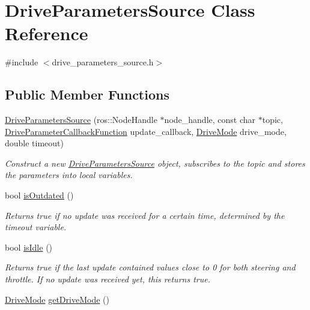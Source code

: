 \hypertarget{class_drive_parameters_source}{}\section{Drive\+Parameters\+Source Class Reference}
\label{class_drive_parameters_source}


{\ttfamily \#include $<$drive\+\_\+parameters\+\_\+source.\+h$>$}

\subsection*{Public Member Functions}
\begin{DoxyCompactItemize}
\item 
\hyperlink{class_drive_parameters_source_ab14e32856e8a672539b1b3ea9e511d0a}{Drive\+Parameters\+Source} (ros\+::\+Node\+Handle $\ast$node\+\_\+handle, const char $\ast$topic, \hyperlink{drive__parameters__source_8h_a87328cd02ddd6c83ff6d4943cf8a93c2}{Drive\+Parameter\+Callback\+Function} update\+\_\+callback, \hyperlink{drive__mode_8h_a4430ce18ab45f139e6843ac0811fda83}{Drive\+Mode} drive\+\_\+mode, double timeout)
\begin{DoxyCompactList}\small\item\em Construct a new \hyperlink{class_drive_parameters_source}{Drive\+Parameters\+Source} object, subscribes to the topic and stores the parameters into local variables. \end{DoxyCompactList}\item 
bool \hyperlink{class_drive_parameters_source_a19ac7507bffaa6167393d24fe5f7f67e}{is\+Outdated} ()
\begin{DoxyCompactList}\small\item\em Returns true if no update was received for a certain time, determined by the timeout variable. \end{DoxyCompactList}\item 
bool \hyperlink{class_drive_parameters_source_a716e9da760080cdc8d0e69553932c789}{is\+Idle} ()
\begin{DoxyCompactList}\small\item\em Returns true if the last update contained values close to 0 for both steering and throttle. If no update was received yet, this returns true. \end{DoxyCompactList}\item 
\hyperlink{drive__mode_8h_a4430ce18ab45f139e6843ac0811fda83}{Drive\+Mode} \hyperlink{class_drive_parameters_source_a4a75910ac804b72f54f268edf5bfee80}{get\+Drive\+Mode} ()
\end{DoxyCompactItemize}


